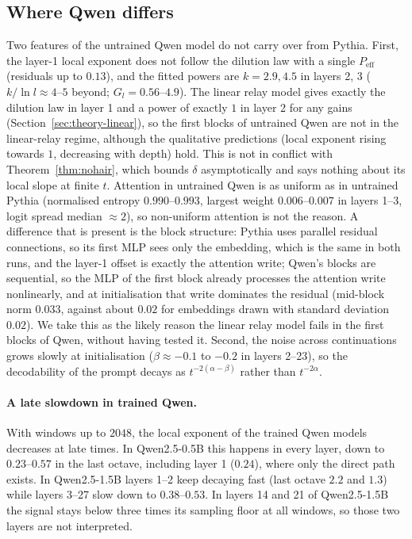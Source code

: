 \documentclass[11pt]{article}
\theoremstyle{definition}
\theoremstyle{remark}
\begin{document}
\subsection{Where Qwen differs}
\label{sec:results-qwen}

Two features of the untrained Qwen model do not carry over from Pythia. First, the layer-1 local exponent does not follow the dilution law with a single $P_{\mathrm{eff}}$ (residuals up to $0.13$), and the fitted powers are $k=2.9, 4.5$ in layers 2, 3 ($k/\ln l\approx4$--$5$ beyond; $G_l=0.56$--$4.9$). The linear relay model gives exactly the dilution law in layer 1 and a power of exactly $1$ in layer 2 for any gains (Section~\ref{sec:theory-linear}), so the first blocks of untrained Qwen are not in the linear-relay regime, although the qualitative predictions (local exponent rising towards $1$, decreasing with depth) hold. This is not in conflict with Theorem~\ref{thm:nohair}, which bounds $\delta$ asymptotically and says nothing about its local slope at finite $t$. Attention in untrained Qwen is as uniform as in untrained Pythia (normalised entropy $0.990$--$0.993$, largest weight $0.006$--$0.007$ in layers 1--3, logit spread median $\approx2$), so non-uniform attention is not the reason. A difference that is present is the block structure: Pythia uses parallel residual connections, so its first MLP sees only the embedding, which is the same in both runs, and the layer-1 offset is exactly the attention write; Qwen's blocks are sequential, so the MLP of the first block already processes the attention write nonlinearly, and at initialisation that write dominates the residual (mid-block norm $0.033$, against about $0.02$ for embeddings drawn with standard deviation $0.02$). We take this as the likely reason the linear relay model fails in the first blocks of Qwen, without having tested it. Second, the noise across continuations grows slowly at initialisation ($\beta\approx-0.1$ to $-0.2$ in layers 2--23), so the decodability of the prompt decays as $t^{-2(\alpha-\beta)}$ rather than $t^{-2\alpha}$.

\paragraph{A late slowdown in trained Qwen.} With windows up to $2048$, the local exponent of the trained Qwen models decreases at late times. In Qwen2.5-0.5B this happens in every layer, down to $0.23$--$0.57$ in the last octave, including layer 1 ($0.24$), where only the direct path exists. In Qwen2.5-1.5B layers 1--2 keep decaying fast (last octave $2.2$ and $1.3$) while layers 3--27 slow down to $0.38$--$0.53$. In layers 14 and 21 of Qwen2.5-1.5B the signal stays below three times its sampling floor at all windows, so those two layers are not interpreted.
\end{document}
